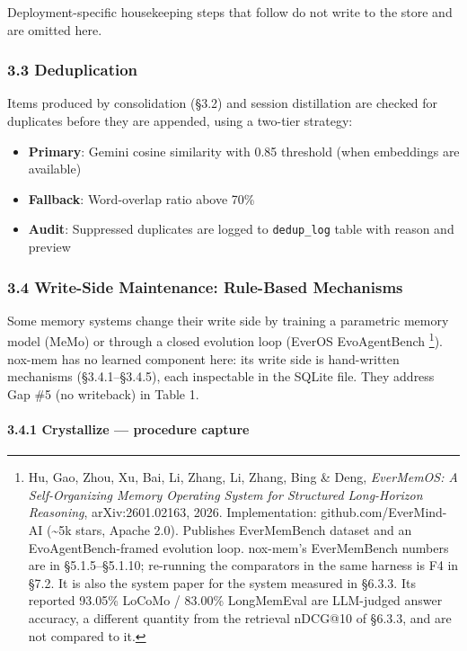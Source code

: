 \documentclass[
]{article}
\providecommand{\tightlist}{%
  \setlength{\itemsep}{0pt}\setlength{\parskip}{0pt}}
\begin{document}
Deployment-specific housekeeping steps that follow do not write to the
store and are omitted here.

\subsubsection{3.3 Deduplication}\label{deduplication}

Items produced by consolidation (§3.2) and session distillation are
checked for duplicates before they are appended, using a two-tier
strategy:

\begin{itemize}
\tightlist
\item
  \textbf{Primary}: Gemini cosine similarity with 0.85 threshold (when
  embeddings are available)
\item
  \textbf{Fallback}: Word-overlap ratio above 70\%
\item
  \textbf{Audit}: Suppressed duplicates are logged to
  \texttt{dedup\_log} table with reason and preview
\end{itemize}

\subsubsection{3.4 Write-Side Maintenance: Rule-Based
Mechanisms}\label{write-side-maintenance-rule-based-mechanisms}

Some memory systems change their write side by training a parametric
memory model (MeMo) or through a closed evolution loop (EverOS
EvoAgentBench \footnote{Hu, Gao, Zhou, Xu, Bai, Li, Zhang, Li, Zhang,
  Bing \& Deng, \emph{EverMemOS: A Self-Organizing Memory Operating
  System for Structured Long-Horizon Reasoning}, arXiv:2601.02163, 2026.
  Implementation: github.com/EverMind-AI (\textasciitilde5k stars,
  Apache 2.0). Publishes EverMemBench dataset and an
  EvoAgentBench-framed evolution loop. nox-mem's EverMemBench numbers
  are in §5.1.5--§5.1.10; re-running the comparators in the same harness
  is F4 in §7.2. It is also the system paper for the system measured in
  §6.3.3. Its reported 93.05\% LoCoMo / 83.00\% LongMemEval are
  LLM-judged answer accuracy, a different quantity from the retrieval
  nDCG@10 of §6.3.3, and are not compared to it.}). nox-mem has no
learned component here: its write side is hand-written mechanisms
(§3.4.1--§3.4.5), each inspectable in the SQLite file. They address Gap
\#5 (no writeback) in Table 1.

\paragraph{3.4.1 Crystallize --- procedure
capture}\label{crystallize-procedure-capture}
\end{document}

